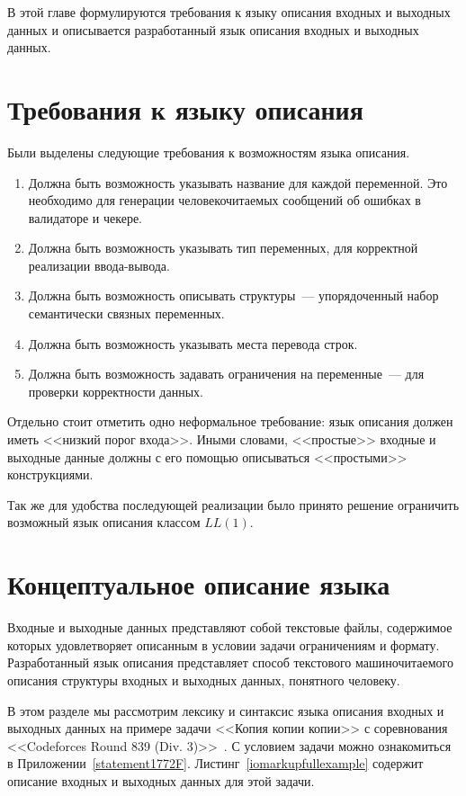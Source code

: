 \documentclass[times,specification,annotation]{style/itmo-student-thesis/itmo-student-thesis}
\begin{document}
В этой главе формулируются требования к языку описания входных и выходных данных и описывается разработанный язык описания входных и выходных данных.

\section{Требования к языку описания}

Были выделены следующие требования к возможностям языка описания.

\begin{enumerate}[leftmargin=1.75cm]
    \item Должна быть возможность указывать название для каждой переменной. Это необходимо для генерации человекочитаемых сообщений об ошибках в валидаторе и чекере.
    \item Должна быть возможность указывать тип переменных, для корректной реализации ввода-вывода.
    \item Должна быть возможность описывать структуры~--- упорядоченный набор семантически связных переменных.
    \item Должна быть возможность указывать места перевода строк.
    \item Должна быть возможность задавать ограничения на переменные~--- для проверки корректности данных.
\end{enumerate}

Отдельно стоит отметить одно неформальное требование: язык описания должен иметь <<низкий порог входа>>. Иными словами, <<простые>> входные и выходные данные должны с его помощью описываться <<простыми>> конструкциями.

Так же для удобства последующей реализации было принято решение ограничить возможный язык описания классом $LL(1)$.

\section{Концептуальное описание языка}\label{lang-concepts}

Входные и выходные данных представляют собой текстовые файлы, содержимое которых удовлетворяет описанным в условии задачи ограничениям и формату. Разработанный язык описания представляет способ текстового машиночитаемого описания структуры входных и выходных данных, понятного человеку. 

В этом разделе мы рассмотрим лексику и синтаксис языка описания входных и выходных данных на примере задачи <<Копия копии копии>> с соревнования <<Codeforces Round 839 (Div. 3)>>~\cite{problem1772F}. С условием задачи можно ознакомиться в Приложении~\ref{statement1772F}. Листинг~\ref{iomarkupfullexample} содержит описание входных и выходных данных для этой задачи.
\end{document}
